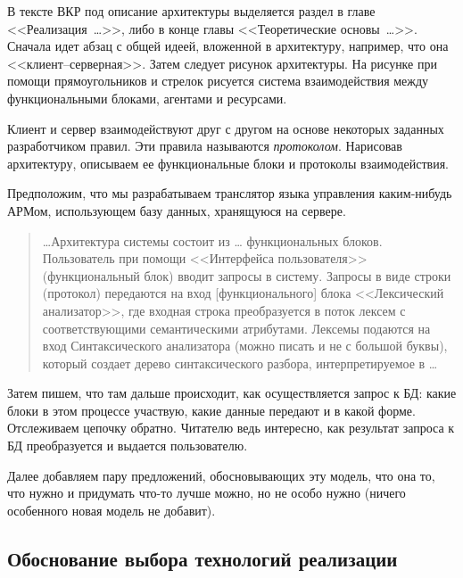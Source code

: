 \documentclass[a4paper,14pt,final]{extreport}
\begin{document}
В тексте ВКР под описание архитектуры выделяется раздел в главе <<Реализация~\ldots>>, либо в конце главы <<Теоретические основы~\ldots{}>>.  Сначала идет абзац с общей идеей, вложенной в архитектуру, например, что она <<клиент--серверная>>.  Затем следует рисунок архитектуры.  На рисунке при помощи прямоугольников и стрелок рисуется система взаимодействия между функциональными блоками, агентами и ресурсами.

Клиент и сервер взаимодействуют друг с другом на основе некоторых заданных разработчиком правил.  Эти правила называются \emph{протоколом}.  Нарисовав архитектуру, описываем ее функциональные блоки и протоколы взаимодействия.

Предположим, что мы разрабатываем транслятор языка управления каким-нибудь АРМом, использующем базу данных, хранящуюся на сервере.
\begin{quote}
  \ldots{}Архитектура системы состоит из \ldots{} функциональных блоков.  Пользователь при помощи <<Интерфейса пользователя>> (функциональный блок) вводит запросы в систему.  Запросы в виде строки (протокол) передаются на вход [функционального] блока <<Лексический анализатор>>, где входная строка преобразуется в поток лексем с соответствующими семантическими атрибутами.  Лексемы подаются на вход Синтаксического анализатора (можно писать и не с большой буквы), который создает дерево синтаксического разбора, интерпретируемое в \ldots{}
\end{quote}
Затем пишем, что там дальше происходит, как осуществляется запрос к БД: какие блоки в этом процессе участвую, какие данные передают и в какой форме.  Отслеживаем цепочку обратно.  Читателю ведь интересно, как результат запроса к БД преобразуется и выдается пользователю.

Далее добавляем пару предложений, обосновывающих эту модель, что она то, что нужно и придумать что-то лучше можно, но не особо нужно (ничего особенного новая модель не добавит).

\subsection{Обоснование выбора технологий реализации}
\label{sec:provtech}
\end{document}
